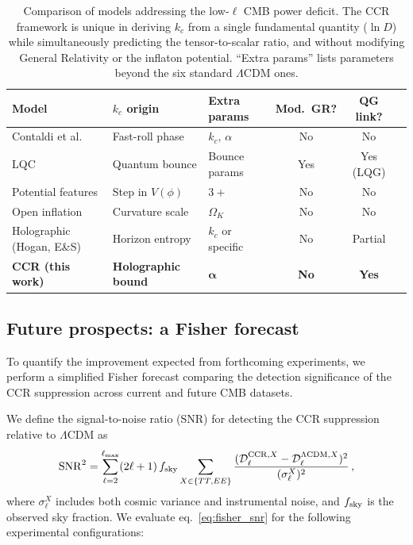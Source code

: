 \begin{table}[t]
  \centering
  \footnotesize
  \begin{tabular}{lllccc}
    \hline\hline
    Model & $k_c$ origin & Extra params & Mod.\ GR? & QG link? \\
    \hline
    Contaldi et al.\ \cite{Contaldi:2003}
      & Fast-roll phase & $k_c,\,\alpha$ & No & No \\
    LQC \cite{Ashtekar:2011,Agullo:2013}
      & Quantum bounce & Bounce params & Yes & Yes (LQG) \\
    Potential features \cite{Starobinsky:1992}
      & Step in $V(\phi)$ & $3+$ & No & No \\
    Open inflation \cite{Ratra:1995}
      & Curvature scale & $\Omega_K$ & No & No \\
    Holographic (Hogan, E\&S)
      & Horizon entropy & $k_c$ or specific & No & Partial \\
    \textbf{CCR (this work)}
      & \textbf{Holographic bound} & $\boldsymbol{\alpha}$
      & \textbf{No} & \textbf{Yes} \\
    \hline\hline
  \end{tabular}
  \caption{Comparison of models addressing the low-$\ell$ CMB power
    deficit. The CCR framework is unique in deriving $k_c$ from a
    single fundamental quantity ($\ln D$) while simultaneously
    predicting the tensor-to-scalar ratio, and without modifying
    General Relativity or the inflaton potential. ``Extra params''
    lists parameters beyond the six standard $\Lambda$CDM ones.}
  \label{tab:model_comparison}
\end{table}

\subsection{Future prospects: a Fisher forecast}
\label{subsec:fisher_forecast}

To quantify the improvement expected from forthcoming experiments, we
perform a simplified Fisher forecast comparing the detection significance
of the CCR suppression across current and future CMB datasets.

We define the signal-to-noise ratio (SNR) for detecting the CCR
suppression relative to $\Lambda$CDM as
\begin{equation}
  \mathrm{SNR}^2 = \sum_{\ell=2}^{\ell_{\rm max}} (2\ell+1)\,f_{\rm sky}
  \sum_{X \in \{TT, EE\}}
  \frac{(\mathcal{D}_\ell^{{\rm CCR}, X} - \mathcal{D}_\ell^{\Lambda{\rm CDM}, X})^2}
       {(\sigma_\ell^X)^2}\,,
  \label{eq:fisher_snr}
\end{equation}
where $\sigma_\ell^X$ includes both cosmic variance and instrumental noise,
and $f_{\rm sky}$ is the observed sky fraction. We evaluate eq.~\eqref{eq:fisher_snr}
for the following experimental configurations:

